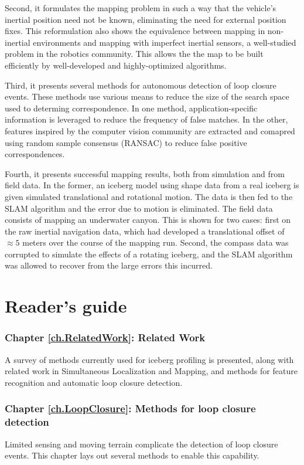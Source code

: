 Second, it formulates the mapping problem in such a way that the vehicle's inertial position need not be known, eliminating the need for external position fixes. This reformulation also shows the equivalence between mapping in non-inertial environments and mapping with imperfect inertial sensors, a well-studied problem in the robotics community. This allows the the map to be built efficiently by well-developed and highly-optimized algorithms.

Third, it presents several methods for autonomous detection of loop closure events. These methods use various means to reduce the size of the search space used to determing correspondence. In one method, application-specific information is leveraged to reduce the frequency of false matches. In the other, features inspired by the computer vision community are extracted and comapred using random sample consensus (RANSAC) to reduce  false positive correspondences.

Fourth, it presents successful mapping results, both from simulation and from field data. In the former, an iceberg model using shape data from a real iceberg is given simulated translational and rotational motion. The data is then fed to the SLAM algorithm and the error due to motion is eliminated. The field data consists of mapping an underwater canyon. This is shown for two cases: first on the raw inertial navigation data, which had developed a translational offset of $\approx  5$ meters over the course of the mapping run. Second, the compass data was corrupted to simulate the effects of a rotating iceberg, and the SLAM algorithm was allowed to recover from the large errors this incurred.

\section{Reader's guide}

\subsubsection*{Chapter \ref{ch.RelatedWork}: Related Work} A survey of methods currently used for iceberg profiling is presented, along with related work in Simultaneous Localization and Mapping, and methods for feature recognition and automatic loop closure detection.

\subsubsection*{Chapter \ref{ch.LoopClosure}: Methods for loop closure detection} Limited sensing and moving terrain complicate the detection of loop closure events. This chapter lays out several methods to enable this capability.

